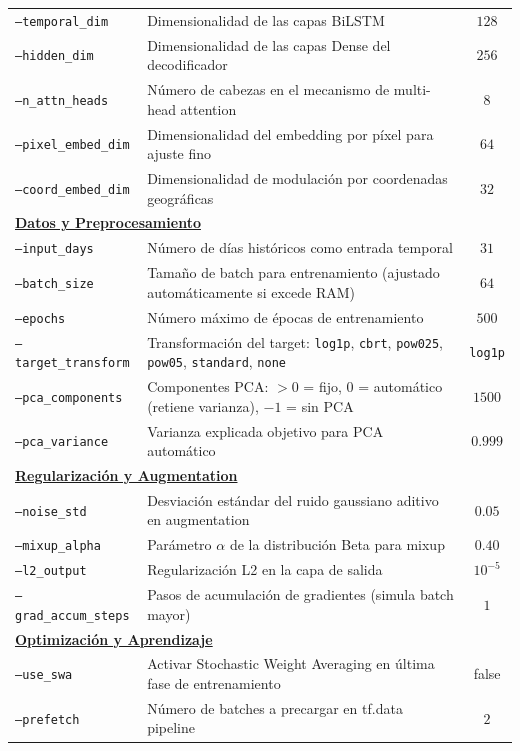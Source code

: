 \begin{table}[h!]
\begin{tabularx}{\textwidth}{|l|p{8cm}|c|}
\texttt{--temporal\_dim} & Dimensionalidad de las capas BiLSTM & $128$ \\
\texttt{--hidden\_dim} & Dimensionalidad de las capas Dense del decodificador & $256$ \\
\texttt{--n\_attn\_heads} & Número de cabezas en el mecanismo de multi-head attention & $8$ \\
\texttt{--pixel\_embed\_dim} & Dimensionalidad del embedding por píxel para ajuste fino & $64$ \\
\texttt{--coord\_embed\_dim} & Dimensionalidad de modulación por coordenadas geográficas & $32$ \\
\hline
\multicolumn{3}{|l|}{\textbf{\underline{Datos y Preprocesamiento}}} \\
\hline
\texttt{--input\_days} & Número de días históricos como entrada temporal & $31$ \\
\texttt{--batch\_size} & Tamaño de batch para entrenamiento (ajustado automáticamente si excede RAM) & $64$ \\
\texttt{--epochs} & Número máximo de épocas de entrenamiento & $500$ \\
\texttt{--target\_transform} & Transformación del target: \texttt{log1p}, \texttt{cbrt}, \texttt{pow025}, \texttt{pow05}, \texttt{standard}, \texttt{none} & \texttt{log1p} \\
\texttt{--pca\_components} & Componentes PCA: $>0$ = fijo, $0$ = automático (retiene varianza), $-1$ = sin PCA & $1500$ \\
\texttt{--pca\_variance} & Varianza explicada objetivo para PCA automático & $0.999$ \\
\hline
\multicolumn{3}{|l|}{\textbf{\underline{Regularización y Augmentation}}} \\
\hline
\texttt{--noise\_std} & Desviación estándar del ruido gaussiano aditivo en augmentation & $0.05$ \\
\texttt{--mixup\_alpha} & Parámetro $\alpha$ de la distribución Beta para mixup & $0.40$ \\
\texttt{--l2\_output} & Regularización L2 en la capa de salida & $10^{-5}$ \\
\texttt{--grad\_accum\_steps} & Pasos de acumulación de gradientes (simula batch mayor) & $1$ \\
\hline
\multicolumn{3}{|l|}{\textbf{\underline{Optimización y Aprendizaje}}} \\
\hline
\texttt{--use\_swa} & Activar Stochastic Weight Averaging en última fase de entrenamiento & false \\
\texttt{--prefetch} & Número de batches a precargar en tf.data pipeline & $2$ \\

\end{tabularx}
\end{table}
